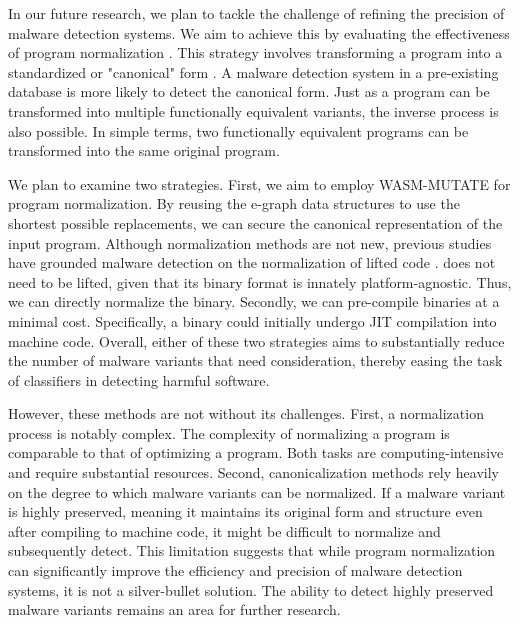 In our future research, we plan to tackle the challenge of refining the precision of malware detection systems. 
We aim to achieve this by evaluating the effectiveness of program normalization \cite{seideman2023transformation}. 
This strategy involves transforming a program into a standardized or "canonical" form \cite{Huang2017BinSequenceFA}.
A malware detection system in a pre-existing database is more likely to detect the canonical form.
Just as a program can be transformed into multiple functionally equivalent variants, the inverse process is also possible. 
In simple terms, two functionally equivalent programs can be transformed into the same original program. 



We plan to examine two strategies. 
First, we aim to employ WASM-MUTATE for program normalization. 
By reusing the e-graph data structures to use the shortest possible replacements, we can secure the canonical representation of the input program. 
Although normalization methods are not new, previous studies have grounded malware detection on the normalization of lifted code \cite{ 6234404, 10.1007/978-3-030-78120-0_5}. 
\Wasm does not need to be lifted, given that its binary format is innately platform-agnostic. 
Thus, we can directly normalize the \Wasm binary.
Secondly, we can pre-compile \Wasm binaries at a minimal cost. 
Specifically, a \Wasm binary could initially undergo JIT compilation into machine code. 
Overall, either of these two strategies aims to substantially reduce the number of malware variants that need consideration, thereby easing the task of classifiers in detecting harmful software. 

However, these methods are not without its challenges. 
First, a normalization process is notably complex. 
The complexity of normalizing a program is comparable to that of optimizing a program. 
Both tasks are computing-intensive and require substantial resources.
Second, canonicalization methods rely heavily on the degree to which malware variants can be normalized.
If a malware variant is highly preserved, meaning it maintains its original form and structure even after compiling to machine code, it might be difficult to normalize and subsequently detect. 
This limitation suggests that while program normalization can significantly improve the efficiency and precision of malware detection systems, it is not a silver-bullet solution. 
The ability to detect highly preserved malware variants remains an area for further research.
    


